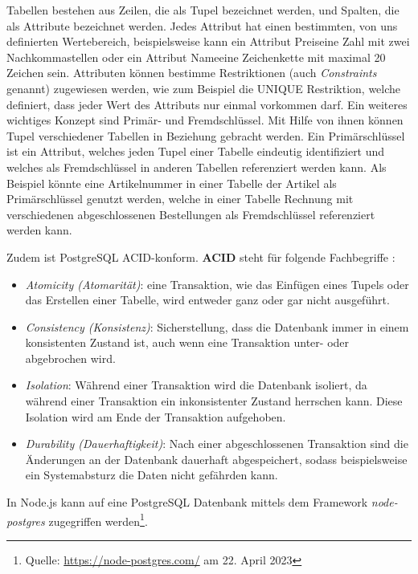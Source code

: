 \documentclass[a4paper,12pt]{report}
\begin{document}
Tabellen bestehen aus Zeilen, die als Tupel bezeichnet werden, und Spalten, die als Attribute bezeichnet werden. Jedes Attribut hat einen bestimmten, von uns definierten Wertebereich, beispielsweise kann ein Attribut \glqq Preis\grqq{ }eine Zahl mit zwei Nachkommastellen oder ein Attribut \glqq Name\grqq{ }eine Zeichenkette mit maximal 20 Zeichen sein.  Attributen können bestimme Restriktionen (auch \textit{Constraints} genannt) zugewiesen werden, wie zum Beispiel die UNIQUE Restriktion, welche definiert, dass jeder Wert des Attributs nur einmal vorkommen darf.
Ein weiteres wichtiges Konzept sind Primär- und Fremdschlüssel. Mit Hilfe von ihnen können Tupel verschiedener Tabellen in Beziehung gebracht werden. Ein Primärschlüssel ist ein Attribut, welches jeden Tupel einer Tabelle eindeutig identifiziert und welches als Fremdschlüssel in anderen Tabellen referenziert werden kann. Als Beispiel könnte eine Artikelnummer in einer Tabelle der Artikel als Primärschlüssel genutzt werden, welche in einer Tabelle Rechnung mit verschiedenen abgeschlossenen Bestellungen als Fremdschlüssel referenziert werden kann.

Zudem ist PostgreSQL ACID-konform. \textbf{ACID} steht für folgende Fachbegriffe \cite{sql-book}:
\begin{itemize}
 \item \textit{Atomicity (Atomarität)}: eine Transaktion, wie das Einfügen eines Tupels oder das Erstellen einer Tabelle, wird entweder ganz oder gar nicht ausgeführt.
 \item \textit{Consistency (Konsistenz)}: Sicherstellung, dass die Datenbank immer in einem konsistenten Zustand ist, auch wenn eine Transaktion unter- oder abgebrochen wird.
 \item \textit{Isolation}: Während einer Transaktion wird die Datenbank isoliert, da während einer Transaktion ein inkonsistenter Zustand herrschen kann. Diese Isolation wird am Ende der Transaktion aufgehoben.
  \item \textit{Durability (Dauerhaftigkeit)}: Nach einer abgeschlossenen Transaktion sind die Änderungen an der Datenbank dauerhaft abgespeichert, sodass beispielsweise ein Systemabsturz die Daten nicht gefährden kann.
\end{itemize}

In Node.js kann auf eine PostgreSQL Datenbank mittels dem Framework \textit{node-postgres} zugegriffen werden\footnote{Quelle: \url{https://node-postgres.com/} am 22. April 2023}.
\end{document}
